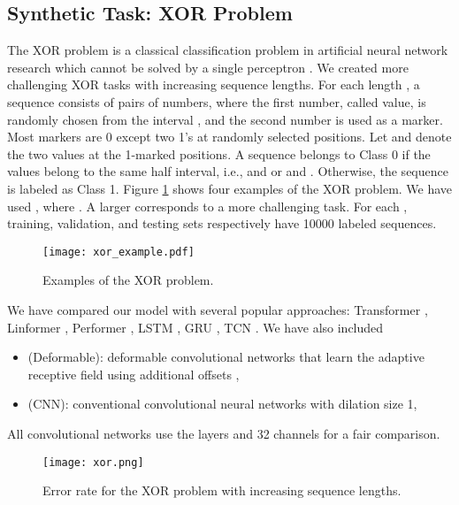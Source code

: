 \documentclass{article}
\begin{document}
\subsection{Synthetic Task: XOR Problem}
\label{subsec:syn}

The XOR problem is a classical classification problem in artificial neural network research which cannot be solved by a single perceptron \cite{minsky69perceptrons, rumelhart:errorpropnonote}. We created more challenging XOR tasks with increasing sequence lengths. For each length , a sequence consists of  pairs of numbers, where the first number, called value, is randomly chosen from the interval , and the second number is used as a marker. Most markers are 0 except two 1's at randomly selected positions. Let  and  denote the two values at the 1-marked positions. A sequence belongs to Class 0 if the values belong to the same half interval, i.e.,  and  or  and . Otherwise, the sequence is labeled as Class 1. Figure \ref{fig:xor_example} shows four examples of the XOR problem. We have used , where . A larger  corresponds to a more challenging task. For each , training, validation, and testing sets respectively have 10000 labeled sequences.

\begin{figure}[tb]
	\centering
	\texttt{[image: xor\_example.pdf]}
	\caption{Examples of the XOR problem.}
	\label{fig:xor_example}
\end{figure}

We have compared our model with several popular approaches: Transformer \cite{vaswani2017attention}, Linformer \cite{wang2020linformer}, Performer \cite{choromanski2020rethinking}, LSTM \cite{hochreiter1997long}, GRU \cite{cho2014properties}, TCN \cite{bai2018empirical}. We have also included
\begin{itemize}
    \item (Deformable): deformable convolutional networks that learn the adaptive receptive field using additional offsets \cite{dai2017deformable},
    \item (CNN): conventional convolutional neural networks with dilation size 1,
\end{itemize}
All convolutional networks use the  layers and 32 channels for a fair comparison.


\begin{figure}[tb]
	\centering
	\texttt{[image: xor.png]}
	\caption{Error rate for the XOR problem with increasing sequence lengths.}
	\label{fig:xor}
\end{figure}
\end{document}
